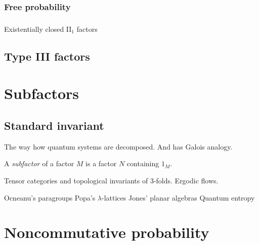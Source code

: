 \documentclass{../../large}
\begin{document}
\section{Free probability}
\section{}
Existentially closed II$_1$ factors





\chapter{Type III factors}



\part{Subfactors}


\chapter{Standard invariant}

The way how quantum systems are decomposed.
And has Galois analogy.

\begin{prb}
A \emph{subfactor} of a factor $M$ is a factor $N$ containing $1_M$.
\end{prb}

Tensor categories and topological invariants of 3-folds.
Ergodic flows.


Ocneanu's paragroups
Popa's $\lambda$-lattices
Jones' planar algebras
Quantum entropy



\part{Noncommutative probability}
\end{document}
